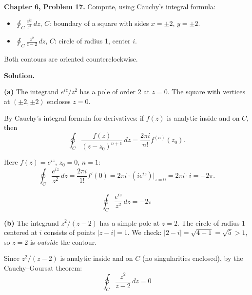 \documentclass[12pt]{article}
\begin{document}
\textbf{Chapter 6, Problem 17.} Compute, using Cauchy's integral formula:
\begin{itemize}
\item[(a)] $\displaystyle\oint_C \frac{e^{iz}}{z^2}\,dz$, \quad $C$: boundary of a square with sides $x = \pm 2$, $y = \pm 2$.
\item[(b)] $\displaystyle\oint_C \frac{z^2}{z-2}\,dz$, \quad $C$: circle of radius 1, center $i$.
\end{itemize}
Both contours are oriented counterclockwise.

\bigskip
\textbf{Solution.}

\textbf{(a)} The integrand $e^{iz}/z^2$ has a pole of order 2 at $z = 0$. The square with vertices at $(\pm 2, \pm 2)$ encloses $z = 0$.

By Cauchy's integral formula for derivatives: if $f(z)$ is analytic inside and on $C$, then
\[
\oint_C \frac{f(z)}{(z-z_0)^{n+1}}\,dz = \frac{2\pi i}{n!}f^{(n)}(z_0).
\]

Here $f(z) = e^{iz}$, $z_0 = 0$, $n = 1$:
\[
\oint_C \frac{e^{iz}}{z^2}\,dz = \frac{2\pi i}{1!}f'(0) = 2\pi i \cdot (ie^{iz})\big|_{z=0} = 2\pi i \cdot i = -2\pi.
\]

\[
\boxed{\oint_C \frac{e^{iz}}{z^2}\,dz = -2\pi}
\]

\textbf{(b)} The integrand $z^2/(z-2)$ has a simple pole at $z = 2$. The circle of radius 1 centered at $i$ consists of points $|z - i| = 1$. We check: $|2 - i| = \sqrt{4+1} = \sqrt{5} > 1$, so $z = 2$ is \emph{outside} the contour.

Since $z^2/(z-2)$ is analytic inside and on $C$ (no singularities enclosed), by the Cauchy--Goursat theorem:
\[
\boxed{\oint_C \frac{z^2}{z-2}\,dz = 0}
\]
\end{document}
